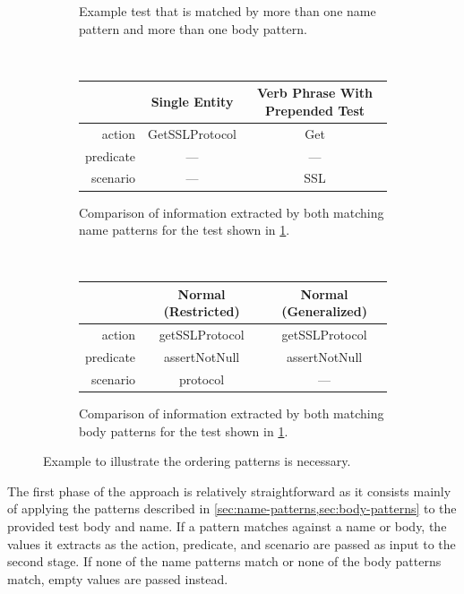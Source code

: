 \begin{figure}[t]
    \centering
    \begin{subfigure}{0.9\textwidth}
        \caption{Example test that is matched by more than one name pattern and more than one body pattern.}
        \label{fig:approach-0}
    \end{subfigure}
    \\[1ex]
        \begin{subfigure}[b]{\columnwidth}
            \centering
            \begin{tabular}{rcc}
            \toprule
                      & Single Entity  & Verb Phrase With Prepended Test \\
            \midrule
            action    & GetSSLProtocol & Get \\
            predicate & ---            & --- \\
            scenario  & ---            & SSL \\
            \bottomrule
            \end{tabular}
            \caption{Comparison of information extracted by both matching name patterns for the test shown in \cref{fig:approach-0}.}
            \label{fig:approach-1}
        \end{subfigure}
    \\[1ex]
    \begin{subfigure}[b]{\columnwidth}
        \centering
        \begin{tabular}{rcc}
        \toprule
                  & Normal (Restricted) & Normal (Generalized) \\
        \midrule
        action    & getSSLProtocol    & getSSLProtocol \\
        predicate & assertNotNull     & assertNotNull \\
        scenario  & protocol          & --- \\
        \bottomrule
        \end{tabular}
        \caption{Comparison of information extracted by both matching body patterns for the test shown in \cref{fig:approach-0}.}
        \label{fig:approach-2}
    \end{subfigure}    
    \caption{Example to illustrate the ordering patterns is necessary.}
    \label{fig:approach-example}
\end{figure}

The first phase of the approach is relatively straightforward as it consists mainly of applying the patterns described in \cref{sec:name-patterns,sec:body-patterns} to the provided test body and name.
%
If a pattern matches against a name or body, the values it extracts as the action, predicate, and scenario are passed as input to the second stage.
%
If none of the name patterns match or none of the body patterns match, empty values are passed instead.


